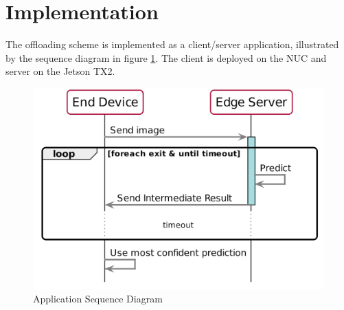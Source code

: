 %	





\section{Implementation} \label{sec:edge-implementation}

The offloading scheme is implemented as a client/server application, illustrated by the sequence diagram in figure \ref{fig:sequence-diagram}. The client is deployed on the NUC and server on the Jetson TX2.

\begin{figure}
	\captionsetup[subfigure]{justification=centering}
	\centering
	\includegraphics[width=.7\linewidth]{figures/models/sequence_diagram}
	\caption[Application Sequence Diagram]{Application Sequence Diagram}
	\label{fig:sequence-diagram}
\end{figure}

